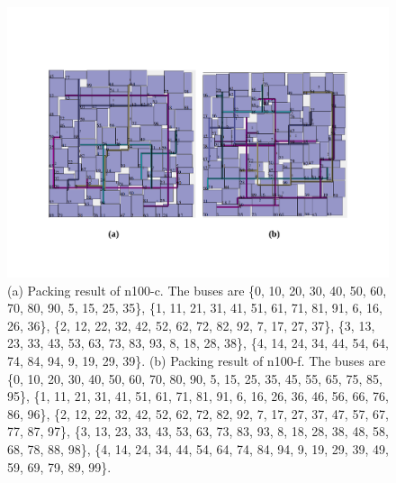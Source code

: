 \begin{figure}[htb]
  \centering
  \centerline{\includegraphics[width=13cm]{Fig/packing_result2.pdf}}
     \caption{
      (a) Packing result of n100-c. The buses are \{0, 10, 20, 30, 40, 50, 60, 70, 80, 90, 5, 15, 25, 35\},
                                                  \{1, 11, 21, 31, 41, 51, 61, 71, 81, 91, 6, 16, 26, 36\},
                                                  \{2, 12, 22, 32, 42, 52, 62, 72, 82, 92, 7, 17, 27, 37\},
                                                  \{3, 13, 23, 33, 43, 53, 63, 73, 83, 93, 8, 18, 28, 38\},
                                                  \{4, 14, 24, 34, 44, 54, 64, 74, 84, 94, 9, 19, 29, 39\}.
      (b) Packing result of n100-f. The buses are \{0, 10, 20, 30, 40, 50, 60, 70, 80, 90, 5, 15, 25, 35, 45, 55, 65, 75, 85, 95\},
                                                  \{1, 11, 21, 31, 41, 51, 61, 71, 81, 91, 6, 16, 26, 36, 46, 56, 66, 76, 86, 96\},
                                                  \{2, 12, 22, 32, 42, 52, 62, 72, 82, 92, 7, 17, 27, 37, 47, 57, 67, 77, 87, 97\},
                                                  \{3, 13, 23, 33, 43, 53, 63, 73, 83, 93, 8, 18, 28, 38, 48, 58, 68, 78, 88, 98\},
                                                  \{4, 14, 24, 34, 44, 54, 64, 74, 84, 94, 9, 19, 29, 39, 49, 59, 69, 79, 89, 99\}.
   }
  \label{fig::packing_result2}
\end{figure}

